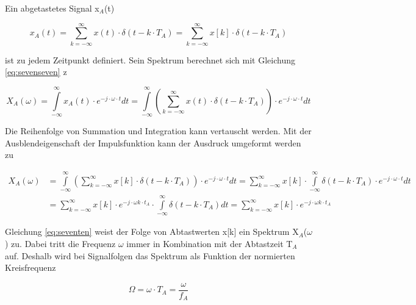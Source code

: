 \noindent Ein abgetastetes Signal x${}_{A}$(t) 

\begin{equation}\label{eq:seveneight}
x_{A} \left(t\right)=\sum _{k=-\infty }^{\infty }x\left(t\right)\cdot \delta \left(t-k\cdot T_{A} \right) =\sum _{k=-\infty }^{\infty }x\left[k\right]\cdot \delta \left(t-k\cdot T_{A} \right)
\end{equation}

ist zu jedem Zeitpunkt definiert. Sein Spektrum berechnet sich mit Gleichung \eqref{eq:sevenseven} z

\begin{equation}\label{eq:sevennine}
X_{A} \left(\omega \right)=\int\limits _{-\infty }^{\infty }x_{A} \left(t\right)\cdot e^{-j\cdot \omega \cdot t}dt=\int\limits _{-\infty }^{\infty }\left(\sum _{k=-\infty }^{\infty }x\left(t\right)\cdot \delta \left(t-k\cdot T_{A} \right) \right)\cdot e^{-j\cdot \omega \cdot t} dt
\end{equation}

\noindent Die Reihenfolge von Summation und Integration kann vertauscht werden. Mit der Ausblendeigenschaft der Impulsfunktion kann der Ausdruck umgeformt werden zu

\begin{equation}\label{eq:seventen}
\begin{split}
X_{A} \left(\omega \right) &=\int\limits _{-\infty }^{\infty }\left(\sum _{k=-\infty }^{\infty }x\left[k\right]\cdot \delta \left(t-k\cdot T_{A} \right) \right)\cdot e^{-j\cdot \omega \cdot t}dt=\sum _{k=-\infty }^{\infty }x\left[k\right]\cdot \int\limits _{-\infty }^{\infty }\delta \left(t-k\cdot T_{A} \right)\cdot e^{-j\cdot \omega \cdot t}dt \\
&=\sum _{k=-\infty }^{\infty }x\left[k\right]\cdot e^{-j\cdot \omega k\cdot t_{A}}\cdot \int\limits _{-\infty }^{\infty }\delta \left(t-k\cdot T_{A} \right)dt=\sum _{k=-\infty }^{\infty }x\left[k\right]\cdot e^{-j\cdot \omega k\cdot t_{A}}
\end{split}
\end{equation}

\noindent Gleichung \eqref{eq:seventen} weist der Folge von Abtastwerten x[k] ein Spektrum X${}_{A}$($\omega$) zu. Dabei tritt die Frequenz $\omega$ immer in Kombination mit der Abtastzeit T${}_{A}$ auf. Deshalb wird bei Signalfolgen das Spektrum als Funktion der normierten Kreisfrequenz

\begin{equation}\label{eq:seveneleven}
\Omega =\omega \cdot T_{A} =\frac{\omega }{f_{A}}
\end{equation}

